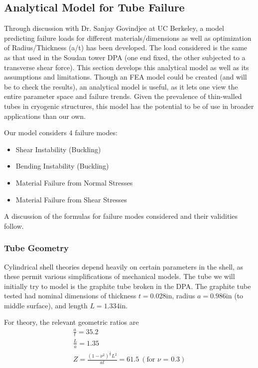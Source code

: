 \documentclass{report}
\begin{document}
\subsection{Analytical Model for Tube Failure}

Through discussion with Dr. Sanjay Govindjee at UC Berkeley, a model predicting failure loads for different materials/dimensions as well as optimization of Radius/Thickness (a/t) has been developed. The load considered is the same as that used in the Soudan tower DPA (one end fixed, the other subjected to a transverse shear force). This section develops this analytical model as well as its assumptions and limitations. Though an FEA model could be created (and will be to check the results), an analytical model is useful, as it lets one view the entire parameter space and failure trends. Given the prevalence of thin-walled tubes in cryogenic structures, this model has the potential to be of use in broader applications than our own.

Our model considers 4 failure modes:
\begin{itemize}
\item Shear Instability (Buckling)
\item Bending Instability (Buckling)
\item Material Failure from Normal Stresses
\item Material Failure from Shear Stresses
\end{itemize}

A discussion of the formulas for failure modes considered and their validities follow.

\subsubsection{Tube Geometry}
Cylindrical shell theories depend heavily on certain parameters in the shell, as these permit various simplifications of mechanical models. The tube we will initially try to model is the graphite tube broken in the DPA. The graphite tube tested had nominal dimensions of thickness $t = 0.028$in, radius $a = 0.986$in (to middle surface), and length $L=1.334$in.

For theory, the relevant geometric ratios are
\begin{eqnarray}
\frac{a}{t} = 35.2 \\
\frac{L}{a} = 1.35 \\
Z = \frac{(1-\nu^2)^\frac{1}{2}L^2}{at} = 61.5 \ (\text{for $\nu$ = 0.3})
\end{eqnarray}
\end{document}
